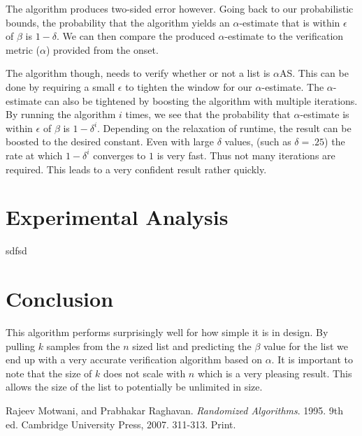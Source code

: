 \documentclass[11pt]{article}
\begin{document}
The algorithm produces two-sided error however. Going back to our probabilistic bounds, the probability that the algorithm yields an $\alpha$-estimate that is within $\epsilon$ of $\beta$ is $1 - \delta$. We can then compare the produced $\alpha$-estimate to the verification metric ($\alpha$) provided from the onset. 

The algorithm though, needs to verify whether or not a list is $\alpha$AS. This can be done by requiring a small $\epsilon$ to tighten the window for our $\alpha$-estimate. The $\alpha$-estimate can also be tightened by boosting the algorithm with multiple iterations. By running the algorithm $i$ times, we see that the probability that $\alpha$-estimate is within $\epsilon$ of $\beta$ is $1 - \delta^i$. Depending on the relaxation of runtime, the result can be boosted to the desired constant. Even with large $\delta$ values, (such as $\delta = .25$) the rate at which $1 - \delta^i$ converges to $1$ is very fast. Thus not many iterations are required. This leads to a very confident result rather quickly.

\section{Experimental Analysis}

sdfsd

\section{Conclusion}

This algorithm performs surprisingly well for how simple it is in design. By pulling $k$ samples from the $n$ sized list and predicting the $\beta$ value for the list we end up with a very accurate verification algorithm based on $\alpha$. It is important to note that the size of $k$ does not scale with $n$ which is a very pleasing result. This allows the size of the list to potentially be unlimited in size.  

\begin{thebibliography}{2}

Rajeev Motwani, and Prabhakar Raghavan.
\textit{Randomized Algorithms}. 1995. 9th ed.
Cambridge University Press, 2007.
311-313. Print.

\end{thebibliography}
\end{document}
